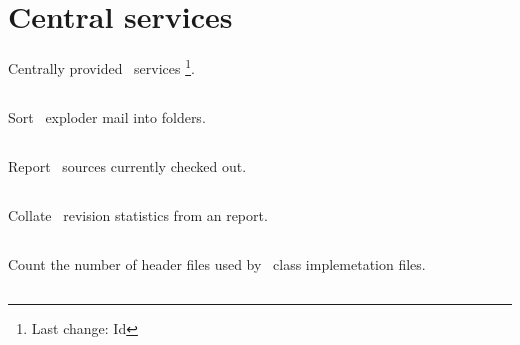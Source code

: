 \chapter{Central services}
\label{Central services}

Centrally provided \aipspp\ services \footnote{Last change:
$ $Id$ $}.


\section{}
\label{aipsmail}

Sort \aipspp\ exploder mail into folders.


\newpage
\section{}
\label{asco}
 
Report \aipspp\ sources currently checked out.
 
 
\newpage
\section{}
\label{astat}
 
Collate \aipspp\ revision statistics from an  report.

 
\newpage
\section{}
\label{depstat}
 
Count the number of header files used by \aipspp\ class implemetation files.

 
\newpage
\section{}
\label{parseform}
 

